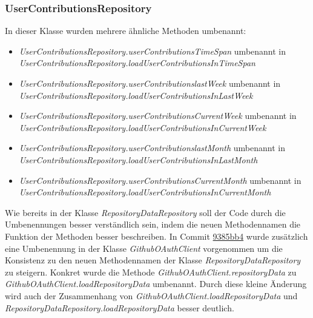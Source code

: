 \documentclass[12pt]{article}
\begin{document}
\subsubsection*{UserContributionsRepository}
In dieser Klasse wurden mehrere ähnliche Methoden umbenannt:
\begin{itemize}
	\item{\textit{UserContributionsRepository.userContributionsTimeSpan} umbenannt in \textit{UserContributionsRepository.loadUserContributionsInTimeSpan}}
	\item{\textit{UserContributionsRepository.userContributionslastWeek} umbenannt in \textit{UserContributionsRepository.loadUserContributionsInLastWeek}}
	\item{\textit{UserContributionsRepository.userContributionsCurrentWeek} umbenannt in \textit{UserContributionsRepository.loadUserContributionsInCurrentWeek}}
	\item{\textit{UserContributionsRepository.userContributionslastMonth} umbenannt in \textit{UserContributionsRepository.loadUserContributionsInLastMonth}}
	\item{\textit{UserContributionsRepository.userContributionsCurrentMonth} umbenannt in \textit{UserContributionsRepository.loadUserContributionsInCurrentMonth}}
\end{itemize}
Wie bereits in der Klasse \textit{RepositoryDataRepository} soll der Code durch die Umbenennungen besser verständlich sein, indem die neuen Methodennamen die Funktion der Methoden besser beschreiben.
\newline
In Commit \href{https://github.com/lukaspanni/OpenSourceStats/commit/9385bb4b9e20b5503e3ea72acd392185f0c533db} {9385bb4} wurde zusätzlich eine Umbenennung in der Klasse \textit{GithubOAuthClient} vorgenommen um die Konsistenz zu den neuen Methodennamen der Klasse \textit{RepositoryDataRepository} zu steigern.
Konkret wurde die Methode \textit{GithubOAuthClient.repositoryData} zu \textit{GithubOAuthClient.loadRepositoryData} umbenannt. Durch diese kleine Änderung wird auch der Zusammenhang von \textit{GithubOAuthClient.loadRepositoryData} und \textit{RepositoryDataRepository.loadRepositoryData} besser deutlich.
\end{document}
